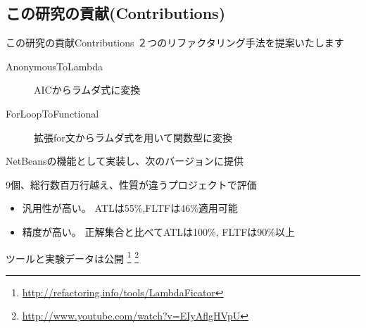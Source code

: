 \subsection{この研究の貢献(Contributions)}
\begin{frame}{この研究の貢献}{Contributions}
  ２つのリファクタリング手法を提案いたします
  \begin{description}
    \item[AnonymousToLambda] AICからラムダ式に変換
    \item[ForLoopToFunctional] 拡張for文からラムダ式を用いて関数型に変換
  \end{description}
  NetBeansの機能として実装し、次のバージョンに提供

  9個、総行数百万行越え、性質が違うプロジェクトで評価
  \begin{itemize}
    \item 汎用性が高い。 ATLは55\%,FLTFは46\%適用可能
    \item 精度が高い。 正解集合と比べてATLは100\%, FLTFは90\%以上
  \end{itemize}

  ツールと実験データは公開
  \footnote{\url{http://refactoring.info/tools/LambdaFicator}}
  \footnote{\url{http://www.youtube.com/watch?v=EIyAflgHVpU}}
\end{frame}
